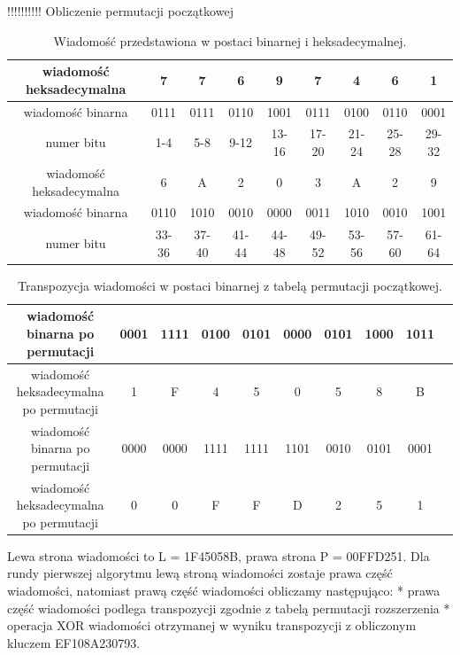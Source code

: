 \documentclass[12p]{article}
\begin{document}
!!!!!!!!!! Obliczenie permutacji początkowej 

\begin{table}[H]
\centering
\begin{tabular}{|c|c|c|c|c|c|c|c|c|}
\hline
wiadomość heksadecymalna & 7 & 7 & 6 & 9 & 7 & 4 & 6 & 1\\ \hline
wiadomość binarna & 0111 & 0111 & 0110 & 1001 & 0111 & 0100 & 0110 & 0001\\ \hline
numer bitu & 1-4 & 5-8 & 9-12 & 13-16 & 17-20 & 21-24 & 25-28 & 29-32\\ \hline
wiadomość heksadecymalna & 6 & A & 2 & 0 & 3 & A & 2 & 9\\ \hline
wiadomość binarna & 0110 & 1010 & 0010 & 0000 & 0011 & 1010 & 0010 & 1001\\ \hline
numer bitu & 33-36 & 37-40 & 41-44 & 44-48 & 49-52 & 53-56 & 57-60 & 61-64\\ \hline
\end{tabular}
\caption{Wiadomość przedstawiona w postaci binarnej i heksadecymalnej.}
\end{table}


\begin{table}[H]
\centering
\begin{tabular}{|c|c|c|c|c|c|c|c|c|c|}
\hline
wiadomość binarna po permutacji & 0001 & 1111 & 0100 & 0101 & 0000 & 0101 & 1000 & 1011\\ \hline
wiadomość heksadecymalna po permutacji & 1 & F & 4 & 5 & 0 & 5 & 8 & B\\ \hline
wiadomość binarna po permutacji & 0000 & 0000 & 1111 & 1111 & 1101 & 0010 & 0101 & 0001\\ \hline
wiadomość heksadecymalna po permutacji & 0 & 0 & F & F & D & 2 & 5 & 1\\ \hline

\end{tabular}
\caption{Transpozycja wiadomości w postaci binarnej z tabelą permutacji początkowej.}
\end{table}



Lewa strona wiadomości to L = 1F45058B, prawa strona P = 00FFD251. 
Dla rundy pierwszej algorytmu lewą stroną wiadomości zostaje prawa część wiadomości, natomiast prawą część wiadomości obliczamy następująco:
*  prawa część wiadomości podlega transpozycji zgodnie z tabelą permutacji rozszerzenia 
* operacja XOR wiadomości otrzymanej w wyniku transpozycji z obliczonym kluczem EF108A230793.
\end{document}
